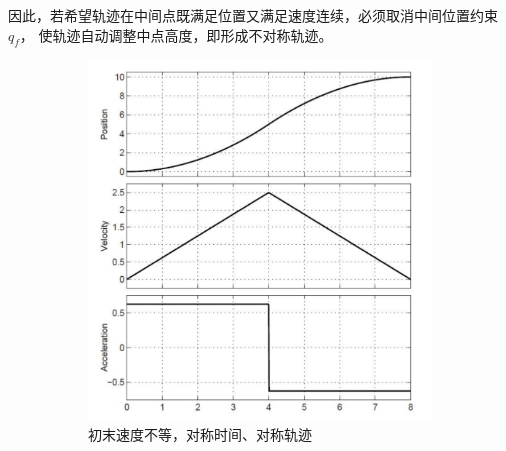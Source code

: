 \documentclass[../main.tex]{subfiles}
\begin{document}
\begin{enumerate}
\begin{enumerate}
{\begin{itemize}
{            因此，若希望轨迹在中间点既满足位置又满足速度连续，必须取消中间位置约束 $q_f$，
            使轨迹自动调整中点高度，即形成不对称轨迹。
            }

            \end{itemize}
            }
            \begin{figure}[htbp]
                \centering
                \begin{subfigure}{0.32\textwidth}
                    \centering
                    \includegraphics[width=\linewidth]{images/pwx1.png}
                    \caption{初末速度不等，对称时间、对称轨迹}
                    \label{fig:pwx1}
                \end{subfigure}
                \begin{subfigure}{0.32\textwidth}
                    \centering

\end{subfigure}
\end{figure}
\end{enumerate}
\end{enumerate}
\end{document}
